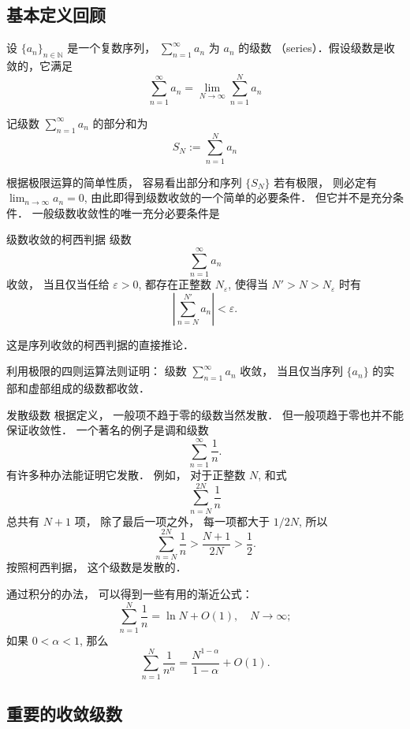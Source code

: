 

\subsection{基本定义回顾}


设 $\{a_n\}_{n\in\mathbb{N}}$ 是一个复数序列， $\sum_{n=1}^\infty a_n$ 为 $a_n$ 的级数 （series）．假设级数是收敛的，它满足
$$
\sum_{n=1}^\infty a_n = \lim_{N \to \infty} \sum_{n=1}^N a_n
$$

记级数 $\sum_{n=1}^\infty a_n$ 的部分和为
\[
S_N := \sum_{n=1}^N a_n
\]

根据极限运算的简单性质， 容易看出部分和序列 $\{S_N\}$ 若有极限， 则必定有 $\lim_{n\to\infty}a_n=0$, 由此即得到级数收敛的一个简单的必要条件． 但它并不是充分条件． 一般级数收敛性的唯一充分必要条件是
\begin{theorem}{级数收敛的柯西判据}
级数
\[
\sum_{n=1}^\infty a_n
\]
收敛， 当且仅当任给 $\varepsilon>0$, 都存在正整数 $N_\varepsilon$, 使得当 $N'>N>N_\varepsilon$ 时有
$$
\left|\sum_{n=N}^{N'} a_n\right|<\varepsilon.
$$
\end{theorem}
这是序列收敛的柯西判据的直接推论．

\begin{exercise}{}
利用极限的四则运算法则证明： 级数 $\sum_{n=1}^\infty a_n$ 收敛， 当且仅当序列 $\{a_n\}$ 的实部和虚部组成的级数都收敛．
\end{exercise}

\begin{example}{发散级数}
根据定义， 一般项不趋于零的级数当然发散． 但一般项趋于零也并不能保证收敛性． 一个著名的例子是调和级数
$$
\sum_{n=1}^\infty\frac{1}{n}.
$$
有许多种办法能证明它发散． 例如， 对于正整数 $N$, 和式
$$
\sum_{n=N}^{2N}\frac{1}{n}
$$
总共有 $N+1$ 项， 除了最后一项之外， 每一项都大于 $1/2N$, 所以
$$
\sum_{n=N}^{2N}\frac{1}{n}>\frac{N+1}{2N}>\frac{1}{2}.
$$
按照柯西判据， 这个级数是发散的．

通过积分的办法， 可以得到一些有用的渐近公式：
$$
\sum_{n=1}^{N}\frac{1}{n}=\ln N+O(1),\quad N\to\infty;
$$
如果 $0<\alpha<1$, 那么
$$
\sum_{n=1}^{N}\frac{1}{n^\alpha}=\frac{N^{1-\alpha}}{1-\alpha}+O(1).
$$
\end{example}

\subsection{重要的收敛级数}


